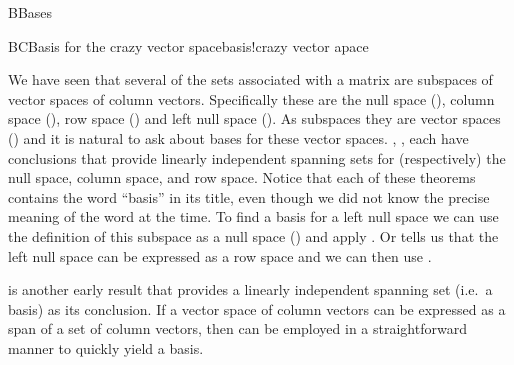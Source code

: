 \begin{subsect}{B}{Bases}
\begin{example}{BC}{Basis for the crazy vector space}{basis!crazy vector apace}
\end{example}
%
\begin{para}We have seen that several of the sets associated with a matrix are subspaces of vector spaces of column vectors.  Specifically these are the null space (), column space (), row space  () and left null space ().  As subspaces they are vector spaces () and it is natural to ask about bases for these vector spaces.  , ,  each have conclusions that provide linearly independent spanning sets for (respectively) the null space, column space, and row space.  Notice that each of these theorems contains the word ``basis'' in its title, even though we did not know the precise meaning of the word at the time.  To find a basis for a left null space we can use the definition of this subspace as a null space () and  apply .  Or  tells us that the left null space can be expressed as a row space and we can then use .\end{para}
%
\begin{para} is another early result that provides a linearly independent spanning set (i.e.\ a basis) as its conclusion.  If a vector space of column vectors can be expressed as a span of a set of column vectors, then  can be employed in a straightforward manner to quickly yield a basis.\end{para}
%
\end{subsect}
%
